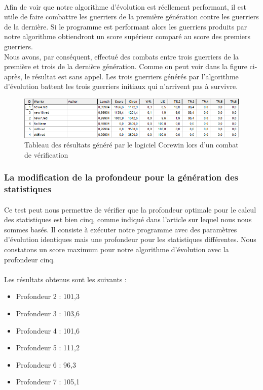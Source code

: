 \documentclass[french]{article}
\begin{document}
            \paragraph{} Afin de voir que notre algorithme d'évolution est réellement performant, il est utile de faire combattre les guerriers de la première génération contre les guerriers de la dernière. Si le programme est performant alors les guerriers produits par notre algorithme obtiendront un score supérieur comparé au score des premiers guerriers.\\
            Nous avons, par conséquent, effectué des combats entre trois guerriers de la première et trois de la dernière génération. Comme on peut voir dans la figure ci-après, le résultat est sans appel. Les trois guerriers générés par l'algorithme d'évolution battent les trois guerriers initiaux qui n'arrivent pas à survivre.
            \begin{figure}[!h]
                \centering \includegraphics[scale=0.6]{image/test1.png}
                \caption{Tableau des résultats généré par le logiciel Corewin lors d'un combat de vérification}
            \end{figure}
        
        \subsubsection{La modification de la profondeur pour la génération des statistiques}
            \paragraph{} Ce test peut nous permettre de vérifier que la profondeur optimale pour le calcul des statistiques est bien cinq, comme indiqué dans l'article sur lequel nous nous sommes basés. Il consiste à exécuter notre programme avec des paramètres d'évolution identiques mais une profondeur pour les statistiques différentes. Nous constatons un score maximum pour notre algorithme d'évolution avec la profondeur cinq. \\ \\
            
            \newpage
            Les résultats obtenus sont les suivants : 
            \begin{itemize}
                \item Profondeur 2 : 101,3
                \item Profondeur 3 : 103,6
                \item Profondeur 4 : 101,6
                \item Profondeur 5 : 111,2
                \item Profondeur 6 : 96,3
                \item Profondeur 7 : 105,1 
            \end{itemize}
            
\end{document}
